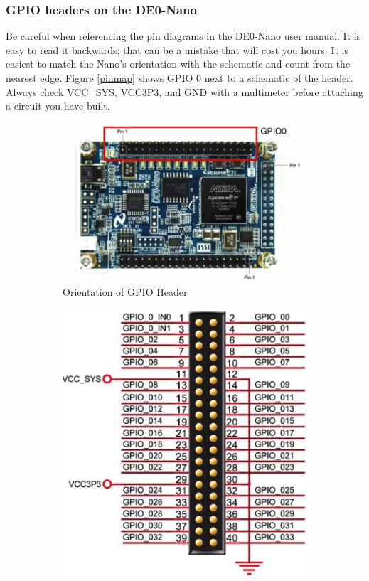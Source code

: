       \subsubsection{GPIO headers on the DE0-Nano} 
        Be careful when referencing the pin diagrams in the DE0-Nano user manual. It is easy to read it backwards; that can be a mistake that will cost you hours. It is easiest to match the Nano's orientation with the schematic and count from the nearest edge. Figure \ref{pinmap} shows GPIO 0 next to a schematic of the header. Always check VCC\_SYS, VCC3P3, and GND with a multimeter before attaching a circuit you have built.        \begin{figure}
          \centering
          \begin{subfigure}[b]{.38\textwidth}
            \includegraphics[angle=270, width=.9\textwidth]{Images/LabeledGPIOHeaders.jpg}
            \caption{Orientation of GPIO Header\cite{DE0Manual}}
          \end{subfigure}
          \begin{subfigure}[b]{.45\textwidth}
            \includegraphics[width=\textwidth]{Images/GPIOHeader.jpg}

\end{subfigure}
\end{figure}

